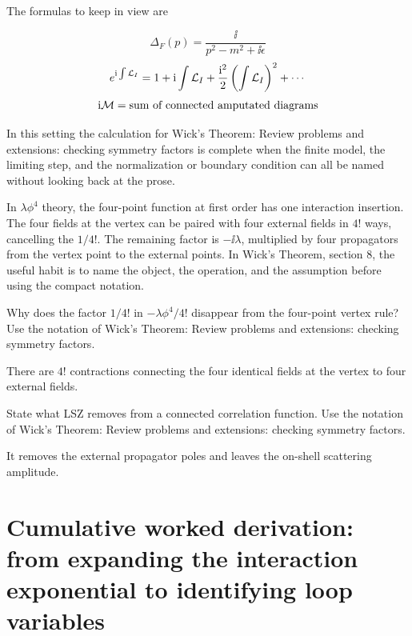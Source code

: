 The formulas to keep in view are

\[
  \Delta_F(p)=\frac{\ii}{p^2-m^2+\ii\epsilon}
\]
\[
  e^{\mathrm i\int\mathcal L_I}=1+\mathrm i\int\mathcal L_I+\frac{\mathrm i^2}{2}\left(\int\mathcal L_I\right)^2+\cdots
\]
\[
  \mathrm i\mathcal M=\hbox{sum of connected amputated diagrams}
\]

In this setting the calculation for Wick's Theorem: Review problems and extensions: checking symmetry factors is complete when the finite model, the limiting step, and the normalization or boundary condition can all be named without looking back at the prose.




\begin{example}
In \(\lambda\phi^4\) theory, the four-point function at first order has one interaction insertion.  The four fields at the vertex can be paired with four external fields in \(4!\) ways, cancelling the \(1/4!\).  The remaining factor is \(-\ii\lambda\), multiplied by four propagators from the vertex point to the external points.  In Wick's Theorem, section 8, the useful habit is to name the object, the operation, and the assumption before using the compact notation.
\end{example}



\begin{exercise}
Why does the factor \(1/4!\) in \(-\lambda\phi^4/4!\) disappear from the four-point vertex rule?  Use the notation of Wick's Theorem: Review problems and extensions: checking symmetry factors.
\begin{answer}
There are \(4!\) contractions connecting the four identical fields at the vertex to four external fields.
\end{answer}
\end{exercise}

\begin{exercise}
State what LSZ removes from a connected correlation function.  Use the notation of Wick's Theorem: Review problems and extensions: checking symmetry factors.
\begin{answer}
It removes the external propagator poles and leaves the on-shell scattering amplitude.
\end{answer}
\end{exercise}



\section{Cumulative worked derivation: from expanding the interaction exponential to identifying loop variables}

